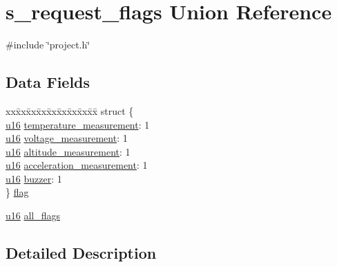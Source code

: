 \hypertarget{unions__request__flags}{\section{s\-\_\-request\-\_\-flags \-Union \-Reference}
\label{unions__request__flags}
}


{\ttfamily \#include \char`\"{}project.\-h\char`\"{}}

\subsection*{\-Data \-Fields}
\begin{DoxyCompactItemize}
\item 
\begin{tabbing}
xx\=xx\=xx\=xx\=xx\=xx\=xx\=xx\=xx\=\kill
struct \{\\
\>\hyperlink{main__ED__BM_8c_a9e6c91d77e24643b888dbd1a1a590054}{u16} \hyperlink{unions__request__flags_a851b146818d28e82773d793261389b80}{temperature\_measurement}: 1\\
\>\hyperlink{main__ED__BM_8c_a9e6c91d77e24643b888dbd1a1a590054}{u16} \hyperlink{unions__request__flags_a34ac0ac4c8f59b9ed016337d132c0961}{voltage\_measurement}: 1\\
\>\hyperlink{main__ED__BM_8c_a9e6c91d77e24643b888dbd1a1a590054}{u16} \hyperlink{unions__request__flags_af1788224f8cde9b265d4426ec54989ed}{altitude\_measurement}: 1\\
\>\hyperlink{main__ED__BM_8c_a9e6c91d77e24643b888dbd1a1a590054}{u16} \hyperlink{unions__request__flags_a8bfa9030e5a42a8c4745e82e25c0cd57}{acceleration\_measurement}: 1\\
\>\hyperlink{main__ED__BM_8c_a9e6c91d77e24643b888dbd1a1a590054}{u16} \hyperlink{unions__request__flags_a63ef67704ea037b7bd26848aa05a5fa4}{buzzer}: 1\\
\} \hyperlink{unions__request__flags_aa7856aa1edd0e3f26421a3283901e2e7}{flag}\\

\end{tabbing}\item 
\hyperlink{main__ED__BM_8c_a9e6c91d77e24643b888dbd1a1a590054}{u16} \hyperlink{unions__request__flags_abf876e68df8575f02084e137cc49266b}{all\-\_\-flags}
\end{DoxyCompactItemize}


\subsection{\-Detailed \-Description}


